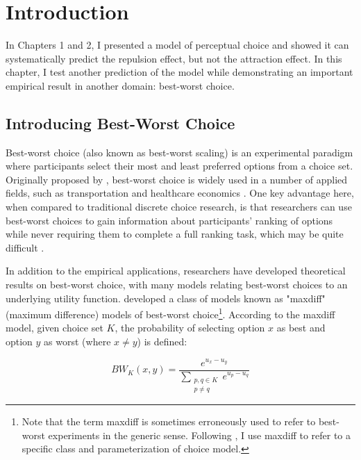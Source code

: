 \section{Introduction}

In Chapters 1 and 2, I presented a model of perceptual choice and showed it can systematically predict the repulsion effect, but not the attraction effect. In this chapter, I test another prediction of the model while demonstrating an important empirical result in another domain: best-worst choice.

\subsection{Introducing Best-Worst Choice}

Best-worst choice (also known as best-worst scaling) is an experimental paradigm where participants select their most and least preferred options from a choice set. Originally proposed by \textcite{finn1992determining}, best-worst choice is widely used in a number of applied fields, such as transportation \parencite{beck2016best} and healthcare economics \parencite{cheung2016using,flynn2007best}. One key advantage here, when compared to traditional discrete choice research, is that researchers can use best-worst choices to gain information about participants' ranking of options while never requiring them to complete a full ranking task, which may be quite difficult \parencite{marleyProbabilisticModelsBest2005}.

In addition to the empirical applications, researchers have developed theoretical results on best-worst choice, with many models relating best-worst choices to an underlying utility function. \textcite{marleyProbabilisticModelsBest2005} developed a class of models known as "maxdiff" (maximum difference) models of best-worst choice\footnote{Note that the term maxdiff is sometimes erroneously used to refer to best-worst experiments in the generic sense. Following \textcite{marleyProbabilisticModelsBest2005}, I use maxdiff to refer to a specific class and parameterization of choice model.}. According to the maxdiff model, given choice set $K$, the probability of selecting option $x$ as best and option $y$ as worst (where $x \neq y$) is defined\parencite{hawkinsIntegratingCognitiveProcess2014a}:

\begin{equation}
   BW_{K}(x,y)=\frac{e^{u_{x}-u_{y}}}{\sum_{\substack{{p,q}\in K\\p \neq q}} e^{u_{p}-u_{q}}}   
   \label{maxdiff_equation}
\end{equation}

